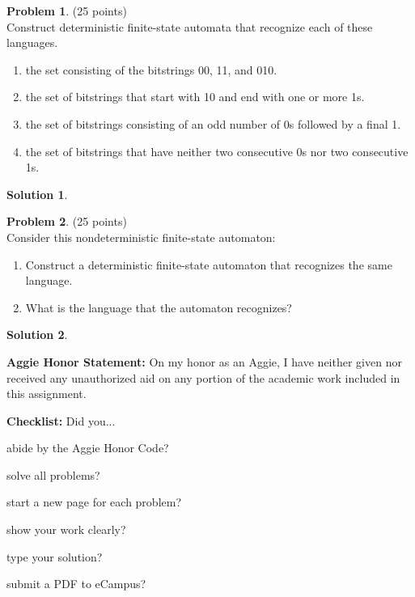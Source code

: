 \documentclass{article}
\theoremstyle{definition}
\newtheorem{problem}{Problem}
\newtheorem*{solution}{Solution}
\newcommand{\honor}{\noindent \textbf{Aggie Honor Statement: }On my honor as an Aggie, I have neither
  given nor received any unauthorized aid on any portion of the academic work included in this assignment.
}
\newcommand{\checklist}{\noindent\textbf{Checklist:}
Did you...
\begin{compactenum}
\item abide by the Aggie Honor Code?
\item solve all problems?
\item start a new page for each problem?
\item show your work clearly?
\item type your solution?
\item submit a PDF to eCampus?
\end{compactenum}
}
\begin{document}
\begin{problem} (25 points)\\
Construct deterministic finite-state automata that recognize each of these languages.
\begin{enumerate}
\item the set consisting of the bitstrings 00, 11, and 010.
\item the set of bitstrings that start with 10 and end with one or more 1s.
\item the set of bitstrings consisting of an odd number of 0s followed by a final 1.
\item the set of bitstrings that have neither two consecutive 0s nor two consecutive 1s.
\end{enumerate}
\end{problem}

\begin{solution}\ \\


\end{solution}

\newpage

\begin{problem} (25 points)\\
Consider this nondeterministic finite-state automaton:\\


\begin{enumerate}
\item Construct a deterministic finite-state automaton that recognizes the same language.
\item What is the language that the automaton recognizes?
\end{enumerate}
\end{problem}

\begin{solution}\ \\


\end{solution}


\bigskip
\honor

\bigskip
\checklist
\end{document}
